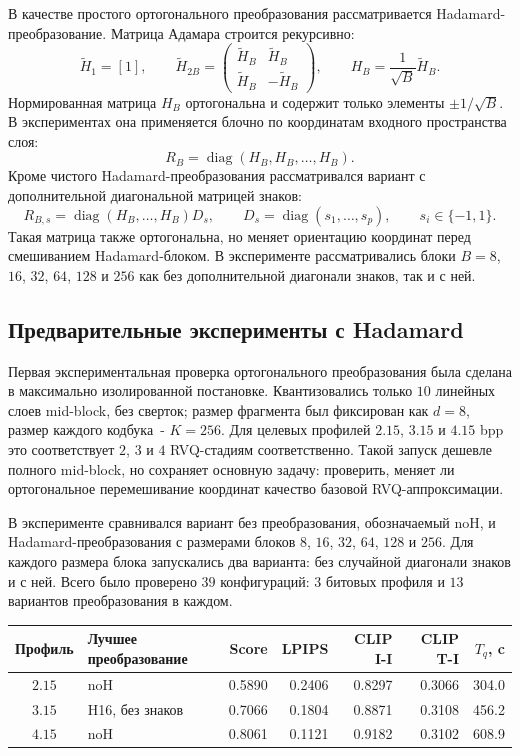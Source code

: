 \documentclass[a4paper,12pt]{article}
\begin{document}
В качестве простого ортогонального преобразования рассматривается Hadamard-преобразование. Матрица Адамара строится рекурсивно:
\[
    \tilde H_1 = [1],
    \qquad
    \tilde H_{2B}
    =
    \begin{pmatrix}
        \tilde H_B & \tilde H_B \\
        \tilde H_B & -\tilde H_B
    \end{pmatrix},
    \qquad
    H_B = \frac{1}{\sqrt{B}} \tilde H_B.
\]
Нормированная матрица $H_B$ ортогональна и содержит только элементы $\pm 1/\sqrt{B}$. В экспериментах она применяется блочно по координатам входного пространства слоя:
\[
    R_B = \operatorname{diag}(H_B, H_B, \ldots, H_B).
\]
Кроме чистого Hadamard-преобразования рассматривался вариант с дополнительной диагональной матрицей знаков:
\[
    R_{B,s}
    =
    \operatorname{diag}(H_B,\ldots,H_B)D_s,
    \qquad
    D_s = \operatorname{diag}(s_1,\ldots,s_p),
    \qquad
    s_i \in \{-1,1\}.
\]
Такая матрица также ортогональна, но меняет ориентацию координат перед смешиванием Hadamard-блоком. В эксперименте рассматривались блоки $B=8$, $16$, $32$, $64$, $128$ и $256$ как без дополнительной диагонали знаков, так и с ней.

\subsection{Предварительные эксперименты с Hadamard}

Первая экспериментальная проверка ортогонального преобразования была сделана в максимально изолированной постановке. Квантизовались только $10$ линейных слоев mid-block, без сверток; размер фрагмента был фиксирован как $d=8$, размер каждого кодбука~- $K=256$. Для целевых профилей $2.15$, $3.15$ и $4.15$ bpp это соответствует $2$, $3$ и $4$ RVQ-стадиям соответственно. Такой запуск дешевле полного mid-block, но сохраняет основную задачу: проверить, меняет ли ортогональное перемешивание координат качество базовой RVQ-аппроксимации.

В эксперименте сравнивался вариант без преобразования, обозначаемый noH, и Hadamard-преобразования с размерами блоков $8$, $16$, $32$, $64$, $128$ и $256$. Для каждого размера блока запускались два варианта: без случайной диагонали знаков и с ней. Всего было проверено $39$ конфигураций: $3$ битовых профиля и $13$ вариантов преобразования в каждом.

\begin{center}
\small
\begin{tabular}{clrrrrr}
\hline
Профиль & Лучшее преобразование & Score & LPIPS & CLIP I-I & CLIP T-I & $T_q$, c \\
\hline
$2.15$ & noH & 0.5890 & 0.2406 & 0.8297 & 0.3066 & 304.0 \\
$3.15$ & H16, без знаков & 0.7066 & 0.1804 & 0.8871 & 0.3108 & 456.2 \\
$4.15$ & noH & 0.8061 & 0.1121 & 0.9182 & 0.3102 & 608.9 \\
\hline
\end{tabular}
\end{center}
\end{document}
